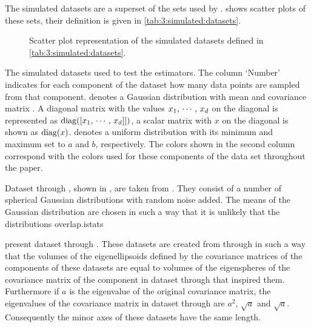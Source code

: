 
The simulated datasets are a superset of the sets used by \textcite{ferdosi2011comparison}.  shows scatter plots of these sets, their definition is given in \cref{tab:3:simulated:datasets}.

\begin{figure*}
	\centering
	
	\caption{Scatter plot representation of the simulated datasets defined in \cref{tab:3:simulated:datasets}. }
	\label{fig:3:simulated:datasets}
\end{figure*}

\begin{table*}
	\centering
	
	\caption{The simulated datasets used to test the estimators. The column `Number' indicates for each component of the dataset how many data points are sampled from that component. \gaussDist{\varMean}{\varCovarianceMatrix} denotes a Gaussian distribution with mean \varMean and covariance matrix \varCovarianceMatrix. A diagonal matrix with the values $x_1,\, \cdots,\, x_d$ on the diagonal is represented as $\operatorname{diag}([x_1,\,\cdots,\,x_d]])$, a scalar matrix with $x$ on the diagonal is shown as $\operatorname{diag}(x)$.  denotes a uniform distribution with its minimum and maximum set to $a$ and $b$, respectively. The colors shown in the second column correspond with the colors used for these components of the data set throughout the paper.} 	
	\label{tab:3:simulated:datasets}
\end{table*}

Dataset \numberstringnum{\ferdosiOneNum} through \numberstringnum{\ferdosiThreeNum}, shown in , are taken from \textcite{ferdosi2011comparison}. They consist of a number of spherical Gaussian distributions with random noise added. The means of the Gaussian distribution are chosen in such a way that it is unlikely that the distributions overlap.istats

 present dataset \numberstringnum{\baakmanOneNum} through \numberstringnum{\baakmanThreeNum}. These datasets are created from \numberstringnum{\ferdosiOneNum} through \numberstringnum{\ferdosiThreeNum} in such a way that the volumes of the eigenellipsoids defined by the covariance matrices of the components of these datasets are equal to volumes of the eigenspheres of the covariance matrix of the component in dataset \numberstringnum{\ferdosiOneNum} through \numberstringnum{\ferdosiThreeNum} that inspired them. Furthermore if $a$ is the eigenvalue of the original covariance matrix, the eigenvalues of the covariance matrix in dataset \numberstringnum{\baakmanOneNum} through \numberstringnum{\baakmanThreeNum} are $a^2$, $\sqrt{a}$ and $\sqrt{a}$. Consequently the minor axes of these datasets have the same length.

